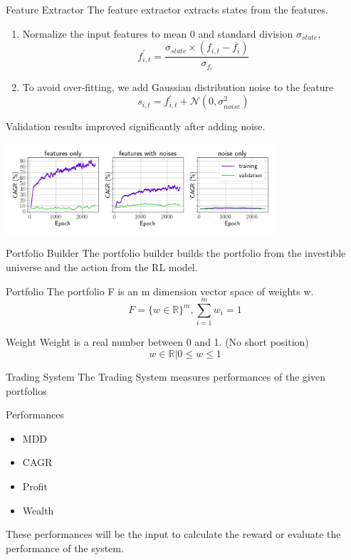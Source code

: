 \begin{frame}{Feature Extractor}
The feature extractor extracts states from the features.
\begin{enumerate}
    \item {
    Normalize the input features to mean 0 and standard division \(\sigma_{state}\),
        \[
            f^{'}_{i,t} = \frac{\sigma_{state} \times   (f_{i,t} -  \overline{f_i})}{\sigma_{f_i}}
        \]
    }
    \item{To avoid over-fitting, we add Gaussian distribution noise to the feature
            \[
            s_{i,t} = f^{'}_{i,t} + \mathcal{N}(0,\sigma_{noise}^2)
        \]
    }
\end{enumerate}
\alert{Validation results improved significantly after adding noise.}
\begin{center}
  \includegraphics[width=10cm]{images/compare_noise.png}
\end{center}
\end{frame}

\begin{frame}{Portfolio Builder}
The portfolio builder builds the portfolio from the investible universe and the action from the RL model.
\\
\begin{block}{Portfolio}
The portfolio F is an m dimension vector space of weights w.
\[
    F = \{ {w \in \mathbb{R} } \} ^m,
    \sum_{i=1}^m {w_i} =1
\]
\end{block}
\begin{block}{Weight}
Weight is a real number between 0 and 1. \alert{(No short position)}
\[
    w \in \mathbb{R} | 0 \leq w \leq 1 
\]
\end{block}
\end{frame}


\begin{frame}{Trading System}
The Trading System measures performances of the given portfolios
\begin{block}{Performances}
\begin{itemize}
    \item MDD
    \item CAGR
    \item Profit
    \item Wealth
\end{itemize}
\end{block}
These performances will be the input to calculate the reward or evaluate the performance of the system. 
\end{frame}


